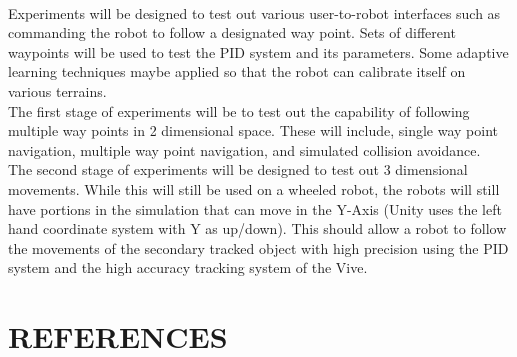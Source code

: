 \documentclass[10pt,a4paper]{article}
\begin{document}
	\\
	Experiments will be designed to test out various user-to-robot interfaces such as commanding the robot to follow a designated way point. Sets of different waypoints will be used to test the PID system and its parameters. Some adaptive learning techniques maybe applied so that the robot can calibrate itself on various terrains.
	\\
	The first stage of experiments will be to test out the capability of following multiple way points in 2 dimensional space. These will include, single way point navigation, multiple way point navigation, and simulated collision avoidance.
	\\
	The second stage of experiments will be designed to test out 3 dimensional movements. While this will still be used on a wheeled robot, the robots will still have portions in the simulation that can move in the Y-Axis (Unity uses the left hand coordinate system with Y as up/down). This should allow a robot to follow the movements of the secondary tracked object with high precision using the PID system and the high accuracy tracking system of the Vive.
	
	\section*{REFERENCES}
	\begin{thebibliography}{99}
		
		
			
		
	
		
		
		
		
		
	\end{thebibliography}
\end{document}
